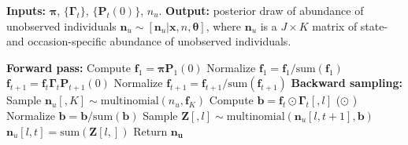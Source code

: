 \documentclass[12pt]{article}
\newcommand{\bx}{\ensuremath{\mathbf{x}}}
\newcommand{\bpi}{\ensuremath{\boldsymbol{\pi}}}
\newcommand{\bG}{\ensuremath{\boldsymbol{\Gamma}}}
\newcommand{\bt}{\ensuremath{\boldsymbol{\theta}}}
\begin{document}
\begin{algorithm}[H]
\caption{FFBS for Unobserved Individuals}
\begin{algorithmic}[1]
\STATE \textbf{Inputs:} $\bpi$, $\{\bG_t\}$, $\{\mathbf{P}_t(0)\}$, $n_u$.
\STATE \textbf{Output:} posterior draw of abundance of unobserved individuals $\mathbf{n}_{u} \sim [\mathbf{n}_{u}|\bx, n, \bt]$, where $\mathbf{n}_u$ is a $J\times K$ matrix of state- and occasion-specific abundance of unobserved individuals. 

\vspace{0.5em}
\STATE \textbf{Forward pass:}
\STATE Compute $\mathbf{f}_1 = \bpi \mathbf{P}_1(0)$
\STATE Normalize $\mathbf{f}_{1} = \mathbf{f}_{1}/\text{sum}(\mathbf{f}_{1})$
    \STATE $\mathbf{f}_{t+1} = \mathbf{f}_{t} \bG_{t} \mathbf{P}_{t+1}(0) $
    \STATE Normalize $\mathbf{f}_{t+1} = \mathbf{f}_{t+1}/\text{sum}(\mathbf{f}_{t+1})$
\ENDFOR
\vspace{0.5em}
\STATE \textbf{Backward sampling:}
\STATE Sample $\mathbf{n}_u[,K] \sim \text{multinomial}(n_u,\mathbf{f}_K)$
     \STATE Compute $\mathbf{b} = \mathbf{f}_t \odot \bG_t[,l]$ ($\odot$ )
     \STATE Normalize $\mathbf{b} = \mathbf{b}/\text{sum}(\mathbf{b})$
     \STATE Sample $\mathbf{Z}[,l] \sim \text{multinomial}(\mathbf{n}_u[l,t+1], \mathbf{b})$
    \ENDFOR
        \STATE $\mathbf{n}_u[l,t] = \text{sum}(\mathbf{Z}[l,])$
    \ENDFOR
\ENDFOR
\STATE Return $\mathbf{\mathbf{n}_u}$
\end{algorithmic}
\end{algorithm}
\end{document}
